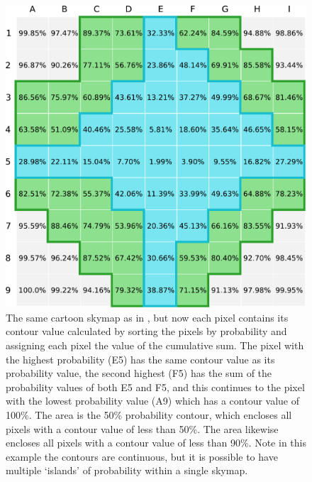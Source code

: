 \begin{colsection}
\begin{colsection}
\clearpage

\begin{figure}[t]
    \begin{center}
        \includegraphics[width=0.95\linewidth]{images/sim/sim_skymap_conts.pdf} %
    \end{center}
    \caption[An example 2D skymap with pixel contour values]{
        The same cartoon skymap as in , but now each pixel contains its contour value calculated by sorting the pixels by probability and assigning each pixel the value of the cumulative sum. The pixel with the highest probability (E5) has the same contour value as its probability value, the second highest (F5) has the sum of the probability values of both E5 and F5, and this continues to the pixel with the lowest probability value (A9) which has a contour value of 100\%. The  area is the 50\% probability contour, which encloses all pixels with a contour value of less than 50\%. The  area likewise encloses all pixels with a contour value of less than 90\%. Note in this example the contours are continuous, but it is possible to have multiple `islands' of probability within a single skymap.
    }\label{fig:sim_skymap_conts}
\end{figure}

\clearpage


\end{colsection}
\end{colsection}
